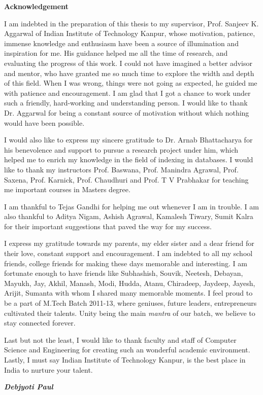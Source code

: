 \begin{center}
	{\huge{\textbf{Acknowledgement}}}
\end{center}

I am indebted in the preparation of this thesis to my supervisor, Prof. Sanjeev K. Aggarwal of Indian Institute of Technology Kanpur, whose motivation, patience, immense knowledge and enthusiasm have been a source of illumination and inspiration for me. His guidance helped me all the time of research, and evaluating the progress of this work. I could not have imagined a better advisor and mentor, who have granted me so much time to explore the width and depth of this field. When I was wrong, things were not going as expected, he guided me with patience and encouragement. I am glad that I got a chance to work under such a friendly, hard-working and understanding person. I would like to thank Dr. Aggarwal for being a constant source of motivation without which nothing would have been possible.

I would also like to express my sincere gratitude to Dr. Arnab Bhattacharya for his benevolence and support to pursue a research project under him, which helped me to enrich my knowledge in the field of indexing in databases. I would like to thank my instructors Prof. Baswana, Prof. Manindra Agrawal, Prof. Saxena, Prof. Karnick, Prof. Chaudhuri and Prof. T V Prabhakar for teaching me important courses in Masters degree.

I am thankful to Tejas Gandhi for helping me out whenever I am in trouble. I am also thankful to Aditya Nigam, Ashish Agrawal, Kamalesh Tiwary, Sumit Kalra for their important suggestions that paved the way for my success.

I express my gratitude towards my parents, my elder sister and a dear friend for their love, constant support and encouragement. I am indebted to all my school friends, college friends for making these days memorable and interesting. I am fortunate enough to have friends like Subhashish, Souvik, Neetesh, Debayan, Mayukh, Jay, Akhil, Manash, Modi, Hudda, Atanu, Chiradeep, Jaydeep, Jayesh, Arijit, Sumanta with whom I shared many memorable moments. I feel proud to be a part of M.Tech Batch 2011-13, where geniuses, future leaders, entrepreneurs cultivated their talents. Unity being the main \emph{mantra} of our batch, we believe to stay connected forever.

Last but not the least, I would like to thank faculty and staff of Computer Science and Engineering for creating such an wonderful academic environment. Lastly, I must say Indian Institute of Technology Kanpur, is the best place in India to nurture your talent.
\vskip 4mm
\begin{flushright}
\textit{\textbf{Debjyoti Paul}}
\end{flushright}




